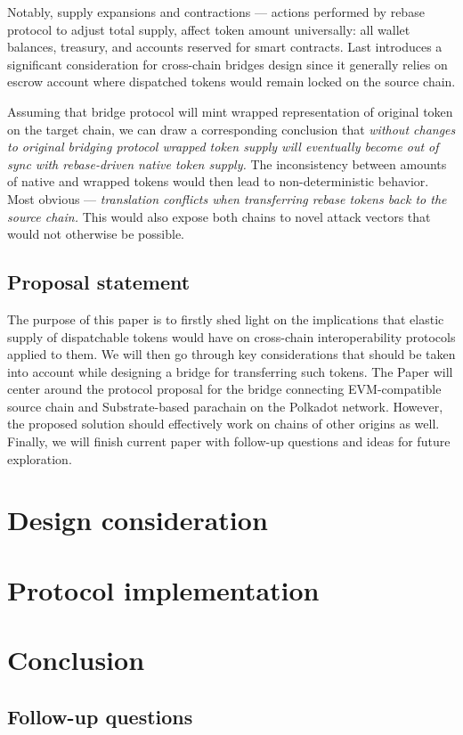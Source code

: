 \documentclass{article}
\begin{document}
Notably, supply expansions and contractions --- actions performed by rebase protocol to adjust total supply, affect token amount universally: all wallet balances, treasury, and accounts reserved for smart contracts. Last introduces a significant consideration for cross-chain bridges design since it generally relies on escrow account where dispatched tokens would remain locked on the source chain.

Assuming that bridge protocol will mint wrapped representation of original token on the target chain, we can draw a corresponding conclusion that \textit{without changes to original bridging protocol wrapped token supply will eventually become out of sync with rebase-driven native token supply.} The inconsistency between amounts of native and wrapped tokens would then lead to non-deterministic behavior. Most obvious --- \textit{translation conflicts when transferring rebase tokens back to the source chain.} This would also expose both chains to novel attack vectors that would not otherwise be possible.

\subsection{Proposal statement}

The purpose of this paper is to firstly shed light on the implications that elastic supply of dispatchable tokens would have on cross-chain interoperability protocols applied to them. We will then go through key considerations that should be taken into account while designing a bridge for transferring such tokens. The Paper will center around the protocol proposal for the bridge connecting EVM-compatible source chain and Substrate-based parachain on the Polkadot network. However, the proposed solution should effectively work on chains of other origins as well. Finally, we will finish current paper with follow-up questions and ideas for future exploration.

\section{Design consideration}

\section{Protocol implementation}

\section{Conclusion}

\subsection{Follow-up questions}



\end{document}
